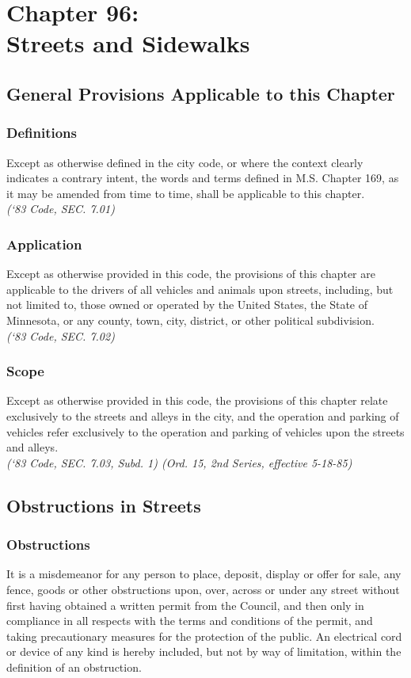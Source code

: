 \chapter*{Chapter 96: \\
	Streets and Sidewalks}
    \minitoc
    \pagebreak

\section{General Provisions Applicable to this Chapter}
\subsection{Definitions}
Except as otherwise defined in the city code, or where the context clearly indicates a contrary intent, the words and terms defined in M.S. Chapter 169, as it may be amended from time to time, shall be applicable to this chapter.\\
\emph{(‘83 Code, SEC. 7.01)}
\subsection{Application}
Except as otherwise provided in this code, the provisions of this chapter are applicable to the drivers of all vehicles and animals upon streets, including, but not limited to, those owned or operated by the United States, the State of Minnesota, or any county, town, city, district, or other political subdivision.\\
\emph{(‘83 Code, SEC. 7.02)}
\subsection{Scope}
Except as otherwise provided in this code, the provisions of this chapter relate exclusively to the streets and alleys in the city, and the operation and parking of vehicles refer exclusively to the operation and parking of vehicles upon the streets and alleys.\\
\emph{(‘83 Code, SEC. 7.03, Subd. 1)  (Ord. 15, 2nd Series, effective 5-18-85)}
\section{Obstructions in Streets}
\subsection{Obstructions}
It is a misdemeanor for any person to place, deposit, display or offer for sale, any fence, goods or other obstructions upon, over, across or under any street without first having obtained a written permit from the Council, and then only in compliance in all respects with the terms and conditions of the permit, and taking precautionary measures for the protection of the public.  An electrical cord or device of any kind is hereby included, but not by way of limitation, within the definition of an obstruction.

